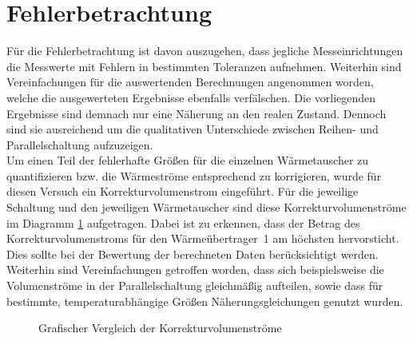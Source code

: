 \section{Fehlerbetrachtung}
\label{sec:fehler}
Für die Fehlerbetrachtung ist davon auszugehen, dass jegliche Messeinrichtungen die Messwerte mit Fehlern in bestimmten Toleranzen aufnehmen. Weiterhin sind Vereinfachungen für die auswertenden Berechnungen angenommen worden, welche die ausgewerteten Ergebnisse ebenfalls verfälschen. Die vorliegenden Ergebnisse sind demnach nur eine Näherung an den realen Zustand. Dennoch sind sie ausreichend um die qualitativen Unterschiede zwischen Reihen- und Parallelschaltung aufzuzeigen.\\
Um einen Teil der fehlerhafte Größen für die einzelnen Wärmetauscher zu quantifizieren bzw. die Wärmeströme entsprechend zu korrigieren, wurde für diesen Versuch ein Korrekturvolumenstrom eingeführt. Für die jeweilige Schaltung und den jeweiligen Wärmetauscher sind diese Korrekturvolumenströme im Diagramm \ref{dia:korrrek} aufgetragen. Dabei ist zu erkennen, dass der Betrag des Korrekturvolumenstroms für den \mbox{Wärmeübertrager 1} am höchsten hervorsticht. Dies sollte bei der Bewertung der berechneten Daten berücksichtigt werden.\\
Weiterhin sind Vereinfachungen getroffen worden, dass sich beispielsweise die Volumenströme in der Parallelschaltung gleichmäßig aufteilen, sowie dass für bestimmte, temperaturabhängige Größen Näherungsgleichungen genutzt wurden.

\begin{figure}[h!]
	\begin{center}
		\caption{Grafischer Vergleich der Korrekturvolumenströme}
		\label{dia:korrrek}
	\end{center}
\end{figure}
\FloatBarrier
\newpage


